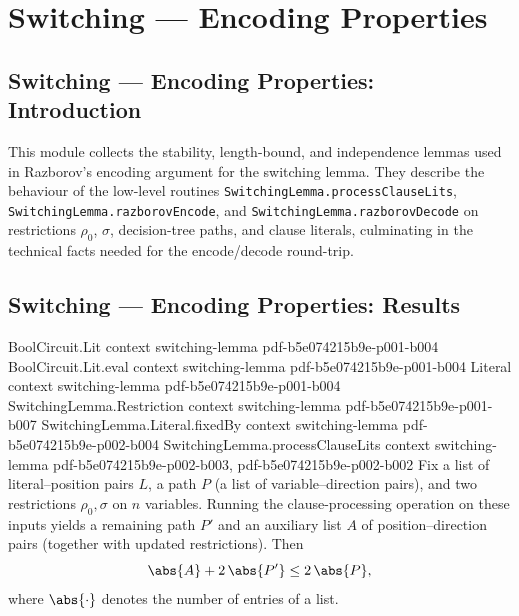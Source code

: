 \section{Switching --- Encoding Properties}
\subsection*{Switching --- Encoding Properties: Introduction}

This module collects the stability, length-bound, and independence lemmas used in
Razborov's encoding argument for the switching lemma. They describe the behaviour of
the low-level routines \texttt{SwitchingLemma.processClauseLits},
\texttt{SwitchingLemma.razborovEncode}, and \texttt{SwitchingLemma.razborovDecode} on
restrictions $\rho_0$, $\sigma$, decision-tree paths, and clause literals, culminating
in the technical facts needed for the encode/decode round-trip.

\subsection*{Switching --- Encoding Properties: Results}

\begin{lemma}
\label{SwitchingLemma.processClauseLits_bound}
\leanok
{}
\proofstep
  {BoolCircuit.Lit}
  {context}
  {switching-lemma}
  {pdf-b5e074215b9e-p001-b004}
\proofstep
  {BoolCircuit.Lit.eval}
  {context}
  {switching-lemma}
  {pdf-b5e074215b9e-p001-b004}
\proofstep
  {Literal}
  {context}
  {switching-lemma}
  {pdf-b5e074215b9e-p001-b004}
\proofstep
  {SwitchingLemma.Restriction}
  {context}
  {switching-lemma}
  {pdf-b5e074215b9e-p001-b007}
\proofstep
  {SwitchingLemma.Literal.fixedBy}
  {context}
  {switching-lemma}
  {pdf-b5e074215b9e-p002-b004}
\proofstep
  {SwitchingLemma.processClauseLits}
  {context}
  {switching-lemma}
  {pdf-b5e074215b9e-p002-b003,
    pdf-b5e074215b9e-p002-b002}
Fix a list of literal–position pairs $L$, a path $P$ (a list of variable–direction
pairs), and two restrictions $\rho_0, \sigma$ on $n$ variables. Running the
clause-processing operation on these inputs yields a remaining path $P'$ and an
auxiliary list $A$ of position–direction pairs (together with updated restrictions).
Then
\[
\abs{A} + 2\,\abs{P'} \le 2\,\abs{P},
\]
where $\abs{\cdot}$ denotes the number of entries of a list.
\end{lemma}


